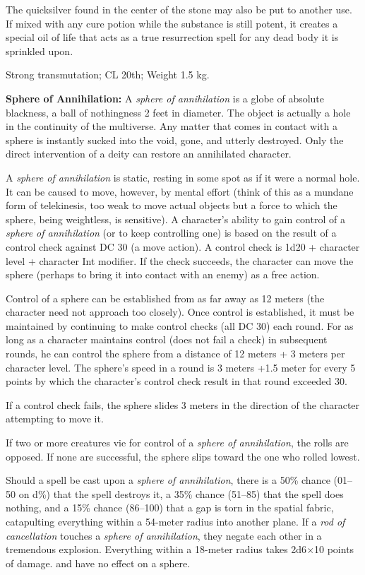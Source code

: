 The quicksilver found in the center of the stone may also be put to another use. If mixed with any cure potion while the substance is still potent, it creates a special oil of life that acts as a true resurrection spell for any dead body it is sprinkled upon.

Strong transmutation; CL 20th; Weight 1.5 kg.

\textbf{Sphere of Annihilation:} A \emph{sphere of annihilation} is a globe of absolute blackness, a ball of nothingness 2 feet in diameter. The object is actually a hole in the continuity of the multiverse. Any matter that comes in contact with a sphere is instantly sucked into the void, gone, and utterly destroyed. Only the direct intervention of a deity can restore an annihilated character.

A \emph{sphere of annihilation} is static, resting in some spot as if it were a normal hole. It can be caused to move, however, by mental effort (think of this as a mundane form of telekinesis, too weak to move actual objects but a force to which the sphere, being weightless, is sensitive). A character's ability to gain control of a \emph{sphere of annihilation} (or to keep controlling one) is based on the result of a control check against DC 30 (a move action). A control check is 1d20 + character level + character Int modifier. If the check succeeds, the character can move the sphere (perhaps to bring it into contact with an enemy) as a free action.

Control of a sphere can be established from as far away as 12 meters (the character need not approach too closely). Once control is established, it must be maintained by continuing to make control checks (all DC 30) each round. For as long as a character maintains control (does not fail a check) in subsequent rounds, he can control the sphere from a distance of 12 meters + 3 meters per character level. The sphere's speed in a round is 3 meters +1.5 meter for every 5 points by which the character's control check result in that round exceeded 30.

If a control check fails, the sphere slides 3 meters in the direction of the character attempting to move it.

If two or more creatures vie for control of a \emph{sphere of annihilation}, the rolls are opposed. If none are successful, the sphere slips toward the one who rolled lowest.

Should a  spell be cast upon a \emph{sphere of annihilation}, there is a 50\% chance (01--50 on d\%) that the spell destroys it, a 35\% chance (51--85) that the spell does nothing, and a 15\% chance (86--100) that a gap is torn in the spatial fabric, catapulting everything within a 54-meter radius into another plane. If a \emph{rod of cancellation} touches a \emph{sphere of annihilation}, they negate each other in a tremendous explosion. Everything within a 18-meter radius takes 2d6$\times$10 points of damage.  and  have no effect on a sphere.

